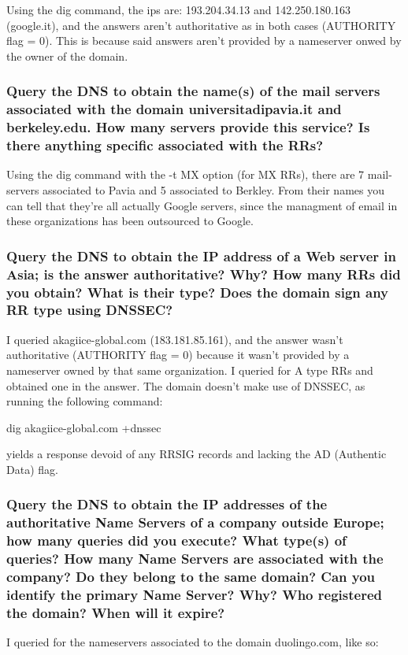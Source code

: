 \documentclass[a4paper,10pt]{article}
\begin{document}
Using the dig command, the ips are: 193.204.34.13 and 142.250.180.163 (google.it), and the answers aren't authoritative as in both cases (AUTHORITY flag = 0). This is because said answers aren't provided by a nameserver onwed by the owner of the domain.

\subsubsection{Query the DNS to obtain the name(s) of the mail servers associated with the
domain universitadipavia.it and berkeley.edu. How many servers
provide this service? Is there anything specific associated with the RRs?}

Using the dig command with the -t MX option (for MX RRs), there are 7 mail-servers associated to Pavia and 5 associated to Berkley. From their names you can tell that they're all actually Google servers, since the managment of email in these organizations has been outsourced to Google.


\subsubsection{Query the DNS to obtain the IP address of a Web server in Asia; is the answer
authoritative? Why? How many RRs did you obtain? What is their type? Does the
domain sign any RR type using DNSSEC?}


I queried akagiice-global.com (183.181.85.161), and the answer wasn't authoritative (AUTHORITY flag = 0) because it wasn't provided by a nameserver owned by that same organization. I queried for A type RRs and obtained one in the answer. The domain doesn't make use of DNSSEC, as running the following command:

dig akagiice-global.com +dnssec 

yields a response devoid of any RRSIG records and lacking the AD (Authentic Data) flag.


\subsubsection{Query the DNS to obtain the IP addresses of the authoritative Name Servers of a company outside Europe; how many queries did you execute? What type(s) of
queries? How many Name Servers are associated with the company? Do they
belong to the same domain? Can you identify the primary Name Server? Why?
Who registered the domain? When will it expire?}

I queried for the nameservers associated to the domain duolingo.com, like so:
\end{document}
